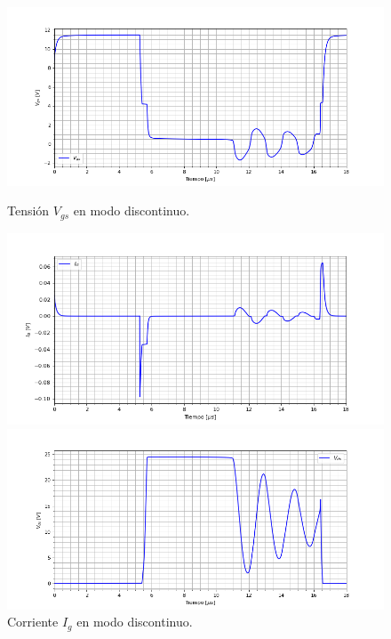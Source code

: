 \begin{figure}
	\centering
	\begin{minipage}{0.495\textwidth}
		\centering
		\includegraphics[width=\textwidth]{ImagenesEjercicio-4/vgs}%
		\caption{Tensión $V_{gs}$ en modo discontinuo.}
		\label{ej4:fig:vgs}
	\end{minipage}\hfill
	\begin{minipage}{0.495\textwidth}
		\centering
		\includegraphics[width=\textwidth]{ImagenesEjercicio-4/ig} %
		\caption{Corriente $I_{g}$ en modo discontinuo.}
		\label{ej4:fig:ig}
	\end{minipage}
	\begin{minipage}{0.495\textwidth}
		\centering
		\includegraphics[width=\textwidth]{ImagenesEjercicio-4/vds} %

\end{minipage}
\end{figure}
